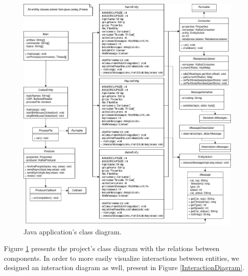 \documentclass[12pt]{article}
\begin{document}
\begin{figure}[H]
  \centering
  \begin{minipage}{\textwidth}
    \centering
    \includegraphics[width=\linewidth]{img/ClassDiagram.png}
  \end{minipage}%
  \caption{Java application's class diagram.}
  \label{ClassDiagram}
\end{figure} 

Figure \ref{ClassDiagram} presents the project's class diagram with the relations between components.
In order to more easily visualize interactions between entities, we designed an interaction diagram as well, present in Figure \ref{InteractionDiagram}.
\end{document}
